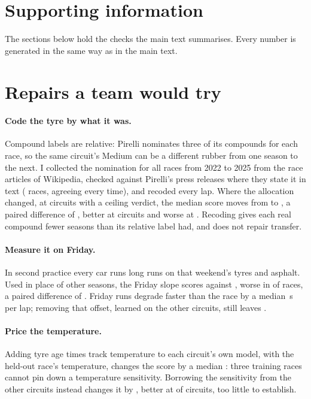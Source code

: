 \documentclass[11pt,a4paper]{article}
\begin{document}
\clearpage
\doublespacing
\linenumbers
\appendix
\renewcommand{\appendixname}{Appendix}
\section*{Supporting information}

The sections below hold the checks the main text summarises. Every number is
generated in the same way as in the main text.

\section{Repairs a team would try}
\label{sec:repairs}

\paragraph{Code the tyre by what it was.} Compound labels are relative: Pirelli
nominates three of its compounds for each race, so the same circuit's Medium
can be a different rubber from one season to the next. I collected the
nomination for all \NAllocationRaces{} races from 2022 to 2025 from the race
articles of Wikipedia, checked against Pirelli's press releases where they state
it in text (\NAllocationPirelli{} races, agreeing every time), and recoded every
lap. Where the allocation changed, at \NCompoundChanged{} circuits with a
ceiling verdict, the median score moves from \CompoundRelative{} to
\CompoundReal{}, a paired difference of \CompoundDiff{} \CompoundDiffCi{}, better
at \NCompoundBetter{} circuits and worse at \NCompoundWorse{}. Recoding gives
each real compound fewer seasons than its relative label had, and does not
repair transfer.

\paragraph{Measure it on Friday.} In second practice every car runs long runs on
that weekend's tyres and asphalt. Used in place of other seasons, the Friday
slope scores \FridayRaw{} against \FridayOther{}, worse in
\NFridayRawWorse{} of \NFridayRaces{} races, a paired difference of
\FridayRawDiff{} \FridayRawDiffCi{}. Friday runs degrade faster than the race by
a median \FridayOffset{}\,s per lap; removing that offset, learned on the other
circuits, still leaves \FridayCorrected{}.

\paragraph{Price the temperature.} Adding tyre age times track temperature to
each circuit's own model, with the held-out race's temperature, changes the score
by a median \TempOwnDiff{} \TempOwnDiffCi{}: three training races cannot pin
down a temperature sensitivity. Borrowing the sensitivity from the other
circuits instead changes it by \TempCatDiff{} \TempCatDiffCi{}, better at
\TempCatBetter{} of \TempN{} circuits, too little to establish.
\end{document}
